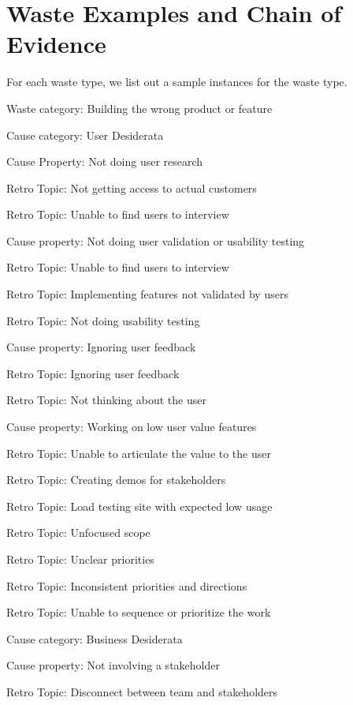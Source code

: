 \chapter{Waste Examples and Chain of Evidence}

For each waste type, we list out a sample instances for the waste type.


Waste category: Building the wrong product or feature

\quad Cause category: User Desiderata

\quad \quad Cause Property: Not doing user research

\quad \quad \quad Retro Topic: Not getting access to actual customers

\quad \quad \quad Retro Topic: Unable to find users to interview

\quad \quad Cause property: Not doing user validation or usability testing

\quad \quad \quad Retro Topic: Unable to find users to interview

\quad \quad \quad Retro Topic: Implementing features not validated by users

\quad \quad \quad Retro Topic: Not doing usability testing

\quad \quad Cause property: Ignoring user feedback

\quad \quad \quad Retro Topic: Ignoring user feedback

\quad \quad \quad Retro Topic: Not thinking about the user

\quad \quad Cause property: Working on low user value features

\quad \quad \quad Retro Topic: Unable to articulate the value to the user

\quad \quad \quad Retro Topic: Creating demos for stakeholders

\quad \quad \quad Retro Topic: Load testing site with expected low usage

\quad \quad \quad Retro Topic: Unfocused scope

\quad \quad \quad Retro Topic: Unclear priorities

\quad \quad \quad Retro Topic: Inconsistent priorities and directions

\quad \quad \quad Retro Topic: Unable to sequence or prioritize the work

\quad Cause category: Business Desiderata

\quad \quad Cause property: Not involving a stakeholder

\quad \quad \quad Retro Topic: Disconnect between team and stakeholders

